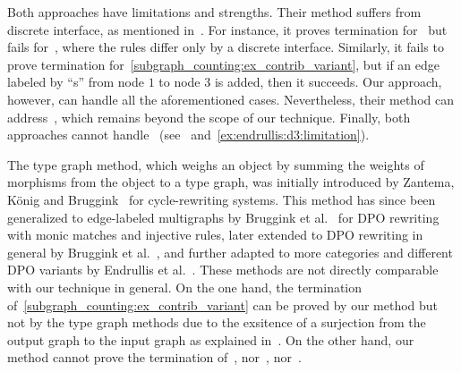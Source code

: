   
Both approaches have limitations and strengths. Their method suffers from discrete interface, as mentioned in~\cite[Example 5.5]{overbeek2024termination_lmcs}. For instance, it proves termination for~\cite[Example 5.5]{overbeek2024termination_lmcs} but fails for~\cite[Example 6.3]{endrullis2024generalized_arxiv_v2}, where the rules differ only by a discrete interface. 
Similarly, it fails to prove termination for~\autoref{subgraph_counting:ex_contrib_variant}, but if an edge labeled by ``s'' from node $1$ to node $3$ is added, then it succeeds. Our approach, however, can handle all the aforementioned cases. Nevertheless, their method can address~\cite[Example 4.1]{plump1995ontermination}, which remains beyond the scope of our technique. Finally, both approaches cannot handle~\cite[Example D.3]{endrullis2024generalized_arxiv_v2} (see~\cite[Remark 6.2]{overbeek2024termination_lmcs} and~\autoref{ex:endrullis:d3:limitation}).

The type graph method, which weighs an object by summing the weights of morphisms from the object to a type graph, was initially introduced by Zantema, K{\"o}nig and Bruggink~\cite{zantema2014termination} for cycle-rewriting systems. 
This method has since been generalized to edge-labeled multigraphs by Bruggink et al.~\cite{bruggink2014termination} for DPO rewriting with monic matches and injective rules, later extended to DPO rewriting in general by Bruggink et al.~\cite{bruggink2015proving}, and further adapted to more categories and different DPO variants by Endrullis et al.~\cite{endrullis2024generalized_arxiv_v2}. 
These methods are not directly comparable with our technique in general.
On the one hand, the termination of~\autoref{subgraph_counting:ex_contrib_variant} can be proved by our method but not by the type graph methods due to the exsitence of a surjection from the output graph to the input graph as explained in~\cite[Example D.4]{endrullis2024generalized_arxiv_v2}. On the other hand, our method cannot prove the termination of~\cite[Example 1, 5 and Ad-hoc Routing Protocol]{bruggink2014termination}, nor~\cite[Example 5, 6]{bruggink2015proving}, nor~\cite[Examples D2 and D3]{endrullis2024generalized_arxiv_v2}.

